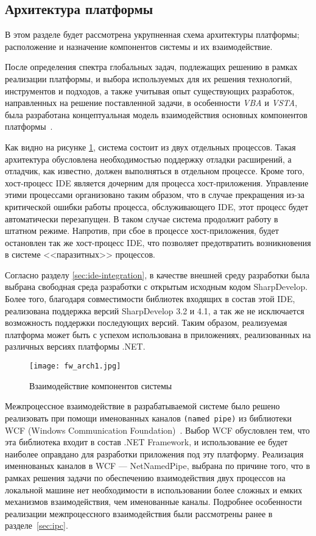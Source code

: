 \subsection{Архитектура платформы}
\label{sec:fw_arch}

В этом разделе будет рассмотрена укрупненная схема архитектуры платформы; расположение и назначение компонентов системы и их взаимодействие.

После определения спектра глобальных задач, подлежащих решению в рамках реализации платформы, и выбора используемых для их решения технологий, инструментов и подходов, а также учитывая опыт существующих разработок, направленных на решение поставленной задачи, в особенности {\it VBA} и {\it VSTA}, была разработана концептуальная модель взаимодействия основных компонентов платформы~\cite{patterns-of-enterprise-app}.

Как видно на рисунке \ref{fw_arch1}, система состоит из двух отдельных процессов. Такая архитектура обусловлена необходимостью поддержку отладки расширений, а отладчик, как известно, должен выполняться в отдельном процессе. Кроме того, хост-процесс IDE является дочерним для процесса хост-приложения. Управление этими процессами организовано таким образом, что в случае прекращения из-за критической ошибки работы процесса, обслуживающего IDE, этот процесс будет автоматически перезапущен. В таком случае система продолжит работу в штатном режиме. Напротив, при сбое в процессе хост-приложения, будет остановлен так же хост-процесс IDE, что позволяет предотвратить возникновения в системе <<паразитных>> процессов.

Согласно разделу \ref{sec:ide-integration}, в качестве внешней среду разработки была выбрана свободная среда разработки с открытым исходным кодом SharpDevelop. Более того, благодаря совместимости библиотек входящих в состав этой IDE, реализована поддержка версий SharpDevelop 3.2 и 4.1, а так же не исключается возможность поддержки последующих версий. Таким образом, реализуемая платформа может быть с успехом использована в приложениях, реализованных на различных версиях платформы .NET.

\begin{figure}[!h]
    \centering
    \texttt{[image: fw\_arch1.jpg]}
    \caption{Взаимодействие компонентов системы}
    \label{fw_arch1}
\end{figure}

Межпроцессное взаимодействие в разрабатываемой системе было решено реализовать при помощи именованных каналов {\tt (named pipe)} из библиотеки WCF (Windows Communication Foundation)~\cite{wcf-services}. Выбор WCF обусловлен тем, что эта библиотека входит в состав .NET Framework, и использование ее будет наиболее оправдано для разработки приложения под эту платформу. Реализация именнованых каналов в WCF --- NetNamedPipe, выбрана по причине того, что в рамках решения задачи по обеспечению взаимодействия двух процессов на локальной машине нет необходимости в использовании более сложных и емких механизмов взаимодействия, чем именованные каналы. Подробнее особенности реализации межпроцессного взаимодействия были рассмотрены ранее в разделе~\ref{sec:ipc}.

